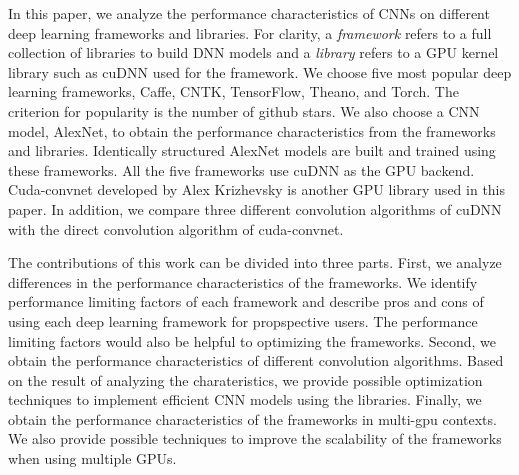 In this paper, we analyze the performance characteristics of CNNs on different deep learning frameworks and libraries. 
For clarity, a \textit{framework} refers to a full collection of libraries to build DNN models and a \textit{library} refers to a GPU kernel library such as cuDNN used for the framework. 
We choose five most popular deep learning frameworks, Caffe\cite{jia2014caffe}, CNTK\cite{cntk}, TensorFlow\cite{tensorflow2015-whitepaper}, Theano\cite{DBLP:journals/corr/Al-RfouAAa16}, and Torch\cite{torch}. 
The criterion for popularity is the number of github\cite{github} stars. 
We also choose a CNN model, AlexNet\cite{krizhevsky2012imagenet}, to obtain the performance characteristics from the frameworks and libraries. 
Identically structured AlexNet models are built and trained using these frameworks. 
All the five frameworks use cuDNN as the GPU backend. 
Cuda-convnet\cite{cuda-convnet} developed by Alex Krizhevsky is another GPU library used in this paper. 
In addition, we compare three different convolution algorithms of cuDNN with the direct convolution algorithm of cuda-convnet.

The contributions of this work can be divided into three parts. 
First, we analyze differences in the performance characteristics of the frameworks. 
We identify performance limiting factors of each framework and describe pros and cons of using each deep learning framework for propspective users. 
The performance limiting factors would also be helpful to optimizing the frameworks. 
Second, we obtain the performance characteristics of different convolution algorithms. 
Based on the result of analyzing the charateristics, we provide possible optimization techniques to implement efficient CNN models using the libraries. 
Finally, we obtain the performance characteristics of the frameworks in multi-gpu contexts. We also provide possible techniques to improve the scalability of the frameworks when using multiple GPUs.

